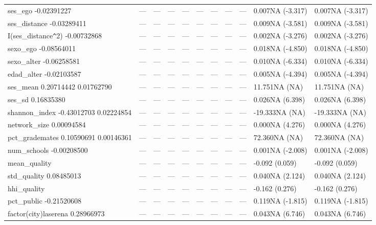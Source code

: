 \begin{table}[ht]
\begin{tabular}{lllllllllll}
  ses\_ego -0.02391227 & --- & --- & --- & --- & --- & --- & --- & --- & 0.007NA (-3.317) & 0.007NA (-3.317) \\ 
  ses\_distance -0.03289411 & --- & --- & --- & --- & --- & --- & --- & --- & 0.009NA (-3.581) & 0.009NA (-3.581) \\ 
  I(ses\_distance\verb|^|2) -0.00732868 & --- & --- & --- & --- & --- & --- & --- & --- & 0.002NA (-3.276) & 0.002NA (-3.276) \\ 
  sexo\_ego -0.08564011 & --- & --- & --- & --- & --- & --- & --- & --- & 0.018NA (-4.850) & 0.018NA (-4.850) \\ 
  sexo\_alter -0.06258581 & --- & --- & --- & --- & --- & --- & --- & --- & 0.010NA (-6.334) & 0.010NA (-6.334) \\ 
  edad\_alter -0.02103587 & --- & --- & --- & --- & --- & --- & --- & --- & 0.005NA (-4.394) & 0.005NA (-4.394) \\ 
  ses\_mean 0.20714442 0.01762790 & --- & --- & --- & --- & --- & --- & --- & --- & 11.751NA (NA) & 11.751NA (NA) \\ 
  ses\_sd 0.16835380 & --- & --- & --- & --- & --- & --- & --- & --- & 0.026NA (6.398) & 0.026NA (6.398) \\ 
  shannon\_index -0.43012703 0.02224854 & --- & --- & --- & --- & --- & --- & --- & --- & -19.333NA (NA) & -19.333NA (NA) \\ 
  network\_size 0.00094584 & --- & --- & --- & --- & --- & --- & --- & --- & 0.000NA (4.276) & 0.000NA (4.276) \\ 
  pct\_grademates 0.10590691 0.00146361 & --- & --- & --- & --- & --- & --- & --- & --- & 72.360NA (NA) & 72.360NA (NA) \\ 
  num\_schools -0.00208500 & --- & --- & --- & --- & --- & --- & --- & --- & 0.001NA (-2.008) & 0.001NA (-2.008) \\ 
  mean\_quality & --- & --- & --- & --- & --- & --- & --- & --- & -0.092 (0.059) & -0.092 (0.059) \\ 
  std\_quality 0.08485013 & --- & --- & --- & --- & --- & --- & --- & --- & 0.040NA (2.124) & 0.040NA (2.124) \\ 
  hhi\_quality & --- & --- & --- & --- & --- & --- & --- & --- & -0.162 (0.276) & -0.162 (0.276) \\ 
  pct\_public -0.21520608 & --- & --- & --- & --- & --- & --- & --- & --- & 0.119NA (-1.815) & 0.119NA (-1.815) \\ 
  factor(city)laserena 0.28966973 & --- & --- & --- & --- & --- & --- & --- & --- & 0.043NA (6.746) & 0.043NA (6.746) \\ 

\end{tabular}
\end{table}
